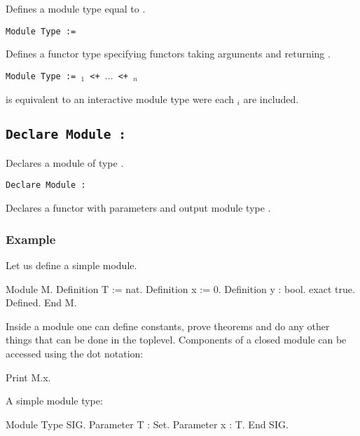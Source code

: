 Defines a module type {\ident} equal to {\modtype}.

\begin{Variants}
\item {\tt Module Type {\ident} {\modbindings} := {\modtype}}

  Defines a functor type {\ident} specifying functors taking arguments
  {\modbindings} and returning {\modtype}.

\item{\tt Module Type {\ident} {\modbindings} := {\modtype$_1$} \verb.<+. $\ldots$ \verb.<+. {\modtype$_n$}}

  is equivalent to an interactive module type were each {\modtype$_i$} are included.

\end{Variants}

\subsection{\tt Declare Module {\ident} : {\modtype}
}

Declares a module {\ident} of type {\modtype}.

\begin{Variants}

\item{\tt Declare Module {\ident} {\modbindings} \verb.:. {\modtype}}

  Declares a functor with parameters {\modbindings} and output module
  type {\modtype}.


\end{Variants}


\subsubsection{Example}

Let us define a simple module.
\begin{coq_example}
Module M.
  Definition T := nat.
  Definition x := 0.
  Definition y : bool.
    exact true.
  Defined.
End M.
\end{coq_example}
Inside a module one can define constants, prove theorems and do any
other things that can be done in the toplevel. Components of a closed
module can be accessed using the dot notation:
\begin{coq_example}
Print M.x.
\end{coq_example}
A simple module type:
\begin{coq_example}
Module Type SIG.
  Parameter T : Set.
  Parameter x : T.
End SIG.
\end{coq_example}

